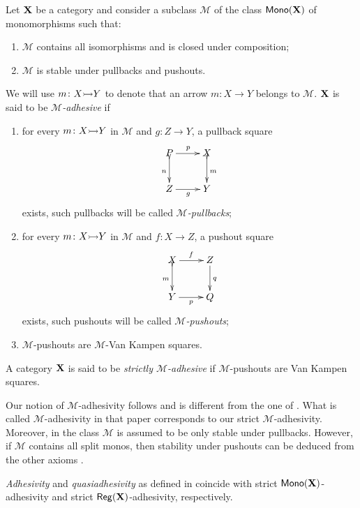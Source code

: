 \begin{definition}
	Let $\textbf {\textup{X}}$ be a category and consider a subclass $\mathcal{M}$ of the class $\mathsf{Mono}(\textbf {\textup{X}})$ of monomorphisms such that:
	\begin{enumerate}
		\item $\mathcal{M}$ contains all isomorphisms and is closed under composition;
		\item $\mathcal{M}$ is stable under pullbacks and pushouts.
	\end{enumerate} 
	We will use $m\colon X\mto Y$ to denote that an arrow $m\colon X\to Y$ belongs to $\mathcal{M}$. $\textbf {\textup{X}}$ is said to be \emph{$\mathcal{M}$-adhesive} if
	\begin{enumerate}
		\item for every $m\colon X\mto Y$ in $\mathcal{M}$ and $g\colon Z\to Y$, a pullback square
		\[\xymatrix{P\ar[r]^p \ar@{>->}[d]_{n}& X \ar@{>->}[d]^{m}\\ Z \ar[r]_g& Y}\]
		exists, such pullbacks will be called \emph{$\mathcal{M}$-pullbacks};
		\item for every $m\colon X\mto Y$ in $\mathcal{M}$ and $f\colon X\to Z$, a pushout square
		\[\xymatrix{X \ar[r]^f \ar@{>->}[d]_{m}& Z \ar[d]^{q}\\ Y\ar[r]_p &Q}\]
		exists, such pushouts  will be called \emph{$\mathcal{M}$-pushouts}; 
		\item  $\mathcal{M}$-pushouts are $\mathcal{M}$-Van Kampen squares.
	\end{enumerate}
	
A category $\textbf {\textup{X}}$ is said to be \emph{strictly $\mathcal{M}$-adhesive} if $\mathcal{M}$-pushouts are Van Kampen squares.	
\end{definition}

\begin{remark}\label{rem:diff}Our notion of $\mathcal{M}$-adhesivity follows \cite{ehrig2012,ehrig2014adhesive} and is different from the one of \cite{azzi2019essence}. What is called $\mathcal{M}$-adhesivity in that paper corresponds to our strict $\mathcal{M}$-adhesivity. Moreover, in \cite{azzi2019essence} the class $\mathcal{M}$ is assumed to be only stable under pullbacks. However, if $\mathcal{M}$ contains all split monos, then stability under pushouts can be deduced from the other axioms \cite[Prop.~$5.1.21$]{castelnovo2023thesis}.
\end{remark}


\begin{remark}\label{rem:salva} 
	\emph{Adhesivity} and \emph{quasiadhesivity} as defined in \cite{lack2005adhesive,garner2012axioms}  coincide with  strict $\mathsf{Mono}(\textbf {\textup{X}}) $-adhesivity and strict $\mathsf{Reg}(\textbf {\textup{X}})$-adhesivity, respectively. 
\end{remark}

